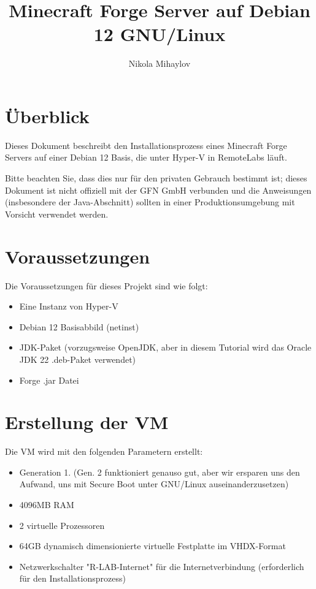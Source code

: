 \documentclass[]{article}
\title{Minecraft Forge Server auf Debian 12 GNU/Linux}
\author{Nikola Mihaylov}
\begin{document}
\maketitle

\newpage

\tableofcontents

\newpage

\section{Überblick}

Dieses Dokument beschreibt den Installationsprozess eines Minecraft Forge Servers auf einer Debian 12 Basis, die unter Hyper-V in RemoteLabs läuft.

Bitte beachten Sie, dass dies nur für den privaten Gebrauch bestimmt ist; dieses Dokument ist nicht offiziell mit der GFN GmbH verbunden und die Anweisungen (insbesondere der Java-Abschnitt) sollten in einer Produktionsumgebung mit Vorsicht verwendet werden.

\section{Voraussetzungen}

Die Voraussetzungen für dieses Projekt sind wie folgt:

\begin{itemize}
    \item Eine Instanz von Hyper-V
    \item Debian 12 Basisabbild (netinst)
    \item JDK-Paket (vorzugsweise OpenJDK, aber in diesem Tutorial wird das Oracle JDK 22 .deb-Paket verwendet)
    \item Forge .jar Datei
\end{itemize}

\section{Erstellung der VM}

Die VM wird mit den folgenden Parametern erstellt:

\begin{itemize}
    \item Generation 1. (Gen. 2 funktioniert genauso gut, aber wir ersparen uns den Aufwand, uns mit Secure Boot unter GNU/Linux auseinanderzusetzen)
    \item 4096MB RAM
    \item 2 virtuelle Prozessoren
    \item 64GB dynamisch dimensionierte virtuelle Festplatte im VHDX-Format
    \item Netzwerkschalter "R-LAB-Internet" für die Internetverbindung (erforderlich für den Installationsprozess)
\end{itemize}
\end{document}
